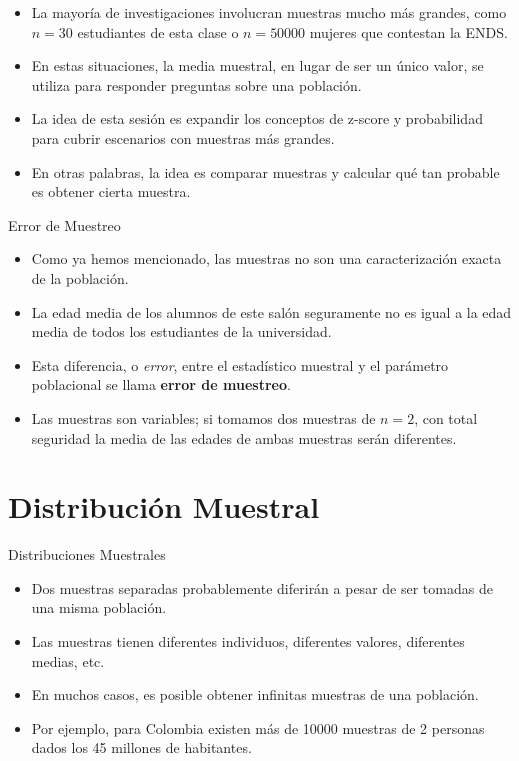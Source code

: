 \documentclass{beamer}
\begin{document}
\begin{frame}
\begin{itemize}
\justifying
\item La mayoría de investigaciones involucran muestras mucho más grandes, como $n=30$ estudiantes de esta clase o $n=50000$ mujeres que contestan la ENDS.
\item En estas situaciones, la media muestral, en lugar de ser un único valor, se utiliza para responder preguntas sobre una población. 
\item La idea de esta sesión es expandir los conceptos de z-score y probabilidad para cubrir escenarios con muestras más grandes.
\item En otras palabras, la idea es comparar muestras y calcular qué tan probable es obtener cierta muestra.
\end{itemize}
\end{frame}

\begin{frame}{Error de Muestreo}
\begin{itemize}
\justifying
\item Como ya hemos mencionado, las muestras no son una caracterización exacta de la población.
\item La edad media de los alumnos de este salón seguramente no es igual a la edad media de todos los estudiantes de la universidad. 
\item Esta diferencia, o \emph{error}, entre el estadístico muestral y el parámetro poblacional se llama {\bf error de muestreo}.
\item Las muestras son variables; si tomamos dos muestras de $n=2$, con total seguridad la media de las edades de ambas muestras serán diferentes. 
\end{itemize}
\end{frame}


\section{Distribución Muestral}
\begin{frame}{Distribuciones Muestrales}
	\begin{itemize}
		\justifying
		\item Dos muestras separadas probablemente diferirán a pesar de ser tomadas de una misma población.
		\item Las muestras tienen diferentes individuos, diferentes valores, diferentes medias, etc.
		\item En muchos casos, es posible obtener infinitas muestras de una población.
		\item Por ejemplo, para Colombia existen más de 10000 muestras de 2 personas dados los 45 millones de habitantes.
	\end{itemize}
\end{frame}
\end{document}
